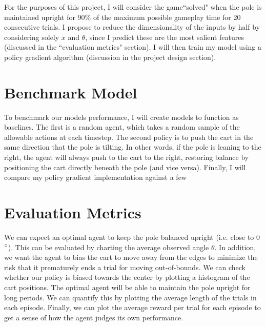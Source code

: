 \documentclass[12pt,a4paper]{article}
\begin{document}
For the purposes of this project, I will consider the game``solved" when the pole is maintained upright for 90\% of the maximum possible gameplay time for 20 consecutive trials. I propose to reduce the dimensionality of the inputs by half by considering solely $x$ and $\theta$, since I predict these are the most salient features (discussed in the ``evaluation metrics" section). I will then train my model using a policy gradient algorithm (discussion in the project design section).

\section*{Benchmark Model}
%
%
To benchmark our models performance, I will create models to function as baselines. The first is a random agent, which takes a random sample of the allowable actions at each timestep. The second policy is to push the cart in the same direction that the pole is tilting. In other words, if the pole is leaning to the right, the agent will always push to the cart to the right, restoring balance by positioning the cart directly beneath the pole (and vice versa). Finally, I will compare my policy gradient implementation against a few 
%
\section*{Evaluation Metrics}
%

We can expect an optimal agent to keep the pole balanced upright (i.e. close to 0$\degree$). This can be evaluated by charting the average observed angle $\theta$. In addition, we want the agent to bias the cart to move away from the edges to minimize the risk that it prematurely ends a trial for moving out-of-bounds. We can check whether our policy is biased towards the center by plotting a histogram of the cart positions. The optimal agent will be able to maintain the pole upright for long periods. We can quantify this by plotting the average length of the trials in each episode. Finally, we can plot the average reward per trial for each episode to get a sense of how the agent judges its own performance.
\end{document}
